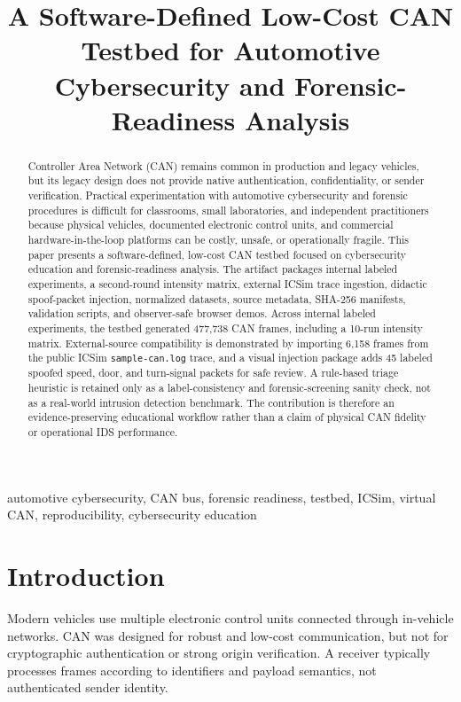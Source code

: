 \documentclass[conference]{IEEEtran}
\title{A Software-Defined Low-Cost CAN Testbed for Automotive Cybersecurity and Forensic-Readiness Analysis}
\author{\IEEEauthorblockN{Osvaldo Janeri Filho}
\IEEEauthorblockA{Independent Researcher / Digital Forensics Practitioner\\
Fortaleza, Cear\'{a}, Brazil\\
Email omitted for blind or camera-ready submission}}
\begin{document}
\maketitle

\begin{abstract}
Controller Area Network (CAN) remains common in production and legacy vehicles, but its legacy design does not provide native authentication, confidentiality, or sender verification. Practical experimentation with automotive cybersecurity and forensic procedures is difficult for classrooms, small laboratories, and independent practitioners because physical vehicles, documented electronic control units, and commercial hardware-in-the-loop platforms can be costly, unsafe, or operationally fragile. This paper presents a software-defined, low-cost CAN testbed focused on cybersecurity education and forensic-readiness analysis. The artifact packages internal labeled experiments, a second-round intensity matrix, external ICSim trace ingestion, didactic spoof-packet injection, normalized datasets, source metadata, SHA-256 manifests, validation scripts, and observer-safe browser demos. Across internal labeled experiments, the testbed generated 477,738 CAN frames, including a 10-run intensity matrix. External-source compatibility is demonstrated by importing 6,158 frames from the public ICSim \texttt{sample-can.log} trace, and a visual injection package adds 45 labeled spoofed speed, door, and turn-signal packets for safe review. A rule-based triage heuristic is retained only as a label-consistency and forensic-screening sanity check, not as a real-world intrusion detection benchmark. The contribution is therefore an evidence-preserving educational workflow rather than a claim of physical CAN fidelity or operational IDS performance.
\end{abstract}

\begin{IEEEkeywords}
automotive cybersecurity, CAN bus, forensic readiness, testbed, ICSim, virtual CAN, reproducibility, cybersecurity education
\end{IEEEkeywords}

\section{Introduction}
Modern vehicles use multiple electronic control units connected through in-vehicle networks. CAN was designed for robust and low-cost communication, but not for cryptographic authentication or strong origin verification. A receiver typically processes frames according to identifiers and payload semantics, not authenticated sender identity.
\end{document}
